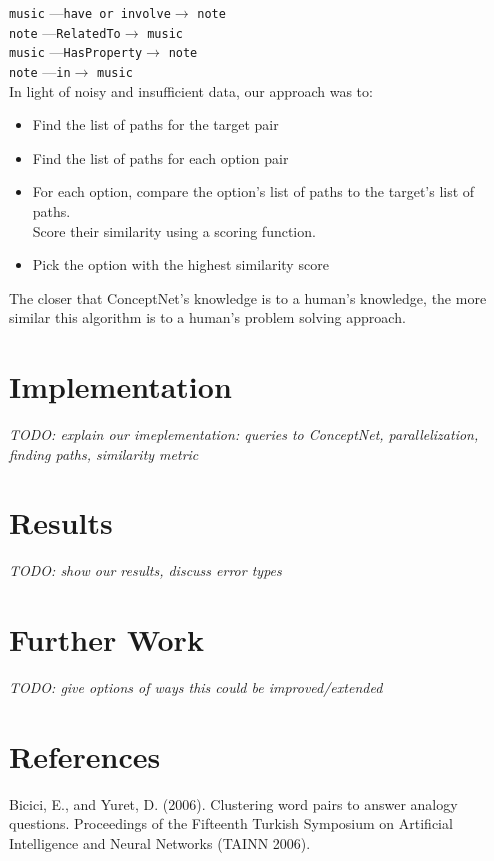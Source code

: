 \documentclass[11pt]{article}
\begin{document}
\verb|music| ---\verb|have or involve|$\rightarrow$ \verb|note|\\
\verb|note| ---\verb|RelatedTo|$\rightarrow$ \verb|music|\\
\verb|music| ---\verb|HasProperty|$\rightarrow$ \verb|note|\\
\verb|note| ---\verb|in|$\rightarrow$ \verb|music|\\

In light of noisy and insufficient data, our approach was to:

\begin{itemize}
\item Find the list of paths for the target pair
\item Find the list of paths for each option pair
\item For each option, compare the option's list of paths to the target's list of paths.\\ Score their similarity using a scoring function.
\item Pick the option with the highest similarity score
\end{itemize}

The closer that ConceptNet's knowledge is to a human's knowledge, the more similar this algorithm is to a human's problem solving approach.

\section{Implementation}
\textit{TODO: explain our imeplementation: queries to ConceptNet, parallelization, finding paths, similarity metric}

\section{Results}
\textit{TODO: show our results, discuss error types}

\section{Further Work}
\textit{TODO: give options of ways this could be improved/extended}

\clearpage

\section*{References}

Bicici, E., and Yuret, D. (2006). Clustering word pairs to answer analogy questions. Proceedings of the Fifteenth Turkish Symposium on Artificial Intelligence and Neural Networks (TAINN 2006).
\end{document}
